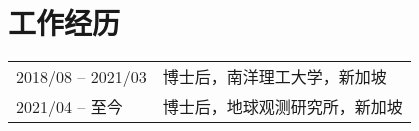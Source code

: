 \section*{工作经历}
\begin{tabular}{p{} p{}}
2018/08 -- 2021/03 & 博士后，南洋理工大学，新加坡 \\
2021/04 -- 至今 & 博士后，地球观测研究所，新加坡 \\
\end{tabular}
